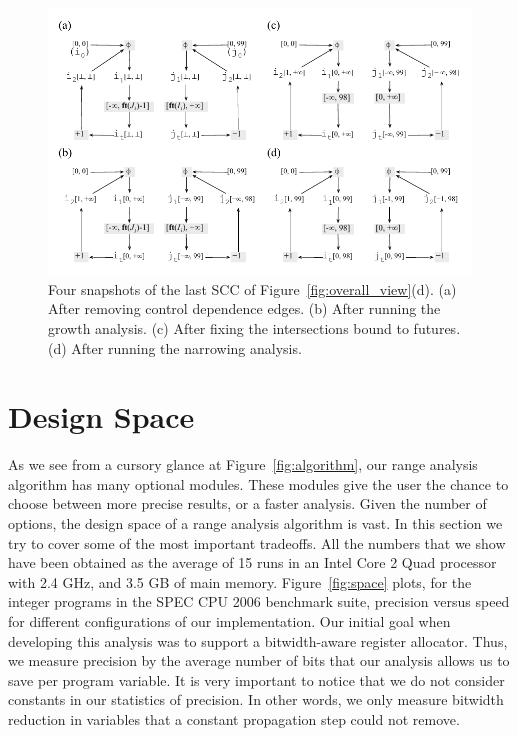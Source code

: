\documentclass{llncs}
\begin{document}
\begin{figure}[t!]
\begin{center}
\includegraphics[width=\textwidth]{images/ex_partition_grow_crop}
\end{center}
\caption{\label{fig:ex_partition_grow_crop}
Four snapshots of the last SCC of Figure~\ref{fig:overall_view}(d).
(a) After removing control dependence edges.
(b) After running the growth analysis.
(c) After fixing the intersections bound to futures.
(d) After running the narrowing analysis.}
\end{figure}

\section{Design Space}
\label{sec:design}

As we see from a cursory glance at Figure~\ref{fig:algorithm}, our range
analysis algorithm has many optional modules.
These modules give the user the chance to choose between more precise results,
or a faster analysis.
Given the number of options, the design space of a range analysis algorithm
is vast.
In this section we try to cover some of the most important tradeoffs.
All the numbers that we show have been obtained as the average of 15 runs in
an Intel Core 2 Quad processor with 2.4 GHz, and 3.5 GB of main memory.
Figure~\ref{fig:space} plots, for the integer programs in the SPEC CPU 2006
benchmark suite, precision versus speed for different configurations of
our implementation.
Our initial goal when developing this analysis was to support a bitwidth-aware
register allocator.
Thus, we measure precision by the average number of bits that our
analysis allows us to save per program variable.
It is very important to notice that we do not consider constants in our statistics of precision.
In other words, we only measure bitwidth reduction in variables that a constant
propagation step could not remove.
\end{document}
